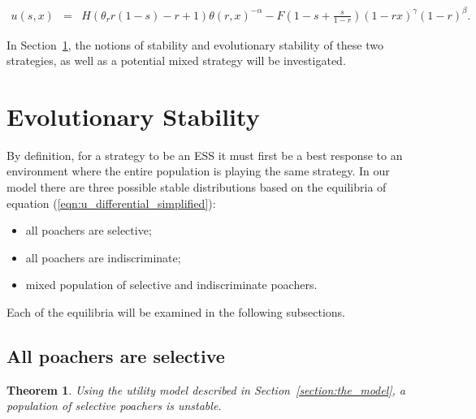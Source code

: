 \documentclass[10pt]{article}
\newtheorem{theorem}{Theorem}
\begin{document}
\begin{eqnarray}
\label{eqn:tutility2}
u(s, x) &=&
H (\theta_r r(1-s) - r + 1)\theta(r,x)^{-\alpha} - F\left(1-s + \frac{s}{1-r} \right)(1-rx)^{\gamma}(1-r)^{\beta} .
\end{eqnarray}

In Section~\ref{section:evolutionary_stability}, the notions of stability
and evolutionary stability of these two strategies, as well as a potential
mixed strategy will be investigated.

\section{Evolutionary Stability}\label{section:evolutionary_stability}

By definition, for a strategy to be an ESS it must first be a best response to an
environment where the entire population is playing the same strategy.
In our model there are three possible stable distributions based on the
equilibria of equation (\ref{eqn:u_differential_simplified}):

\begin{itemize} 
    \item all poachers are selective;
    \item all poachers are indiscriminate;
    \item mixed population of selective and indiscriminate poachers.
\end{itemize}

\noindent Each of the equilibria will be examined in the following subsections.

\subsection{All poachers are selective}

\begin{theorem}\label{theorem:selective}
Using the utility model described in Section~\ref{section:the_model},
a population of selective poachers is unstable.
\end{theorem}
\end{document}
